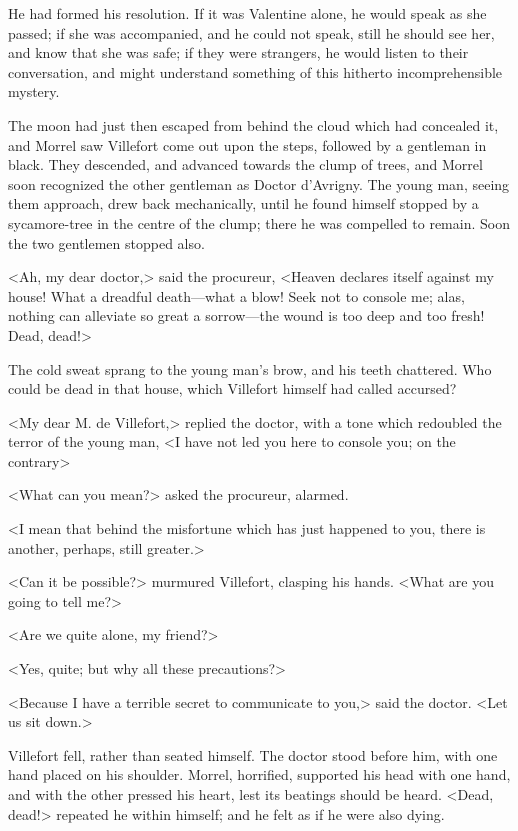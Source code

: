  He had formed his resolution. If it was Valentine alone, he would speak as she passed; if she was accompanied, and he could not speak, still he should see her, and know that she was safe; if they were strangers, he would listen to their conversation, and might understand something of this hitherto incomprehensible mystery. 

 The moon had just then escaped from behind the cloud which had concealed it, and Morrel saw Villefort come out upon the steps, followed by a gentleman in black. They descended, and advanced towards the clump of trees, and Morrel soon recognized the other gentleman as Doctor d'Avrigny.  The young man, seeing them approach, drew back mechanically, until he found himself stopped by a sycamore-tree in the centre of the clump; there he was compelled to remain. Soon the two gentlemen stopped also. 

 <Ah, my dear doctor,> said the procureur, <Heaven declares itself against my house! What a dreadful death—what a blow! Seek not to console me; alas, nothing can alleviate so great a sorrow—the wound is too deep and too fresh! Dead, dead!> 

 The cold sweat sprang to the young man's brow, and his teeth chattered. Who could be dead in that house, which Villefort himself had called accursed? 

 <My dear M. de Villefort,> replied the doctor, with a tone which redoubled the terror of the young man, <I have not led you here to console you; on the contrary\longdash> 

 <What can you mean?> asked the procureur, alarmed. 

 <I mean that behind the misfortune which has just happened to you, there is another, perhaps, still greater.> 

 <Can it be possible?> murmured Villefort, clasping his hands. <What are you going to tell me?> 

 <Are we quite alone, my friend?> 

 <Yes, quite; but why all these precautions?> 

 <Because I have a terrible secret to communicate to you,> said the doctor. <Let us sit down.> 

 Villefort fell, rather than seated himself. The doctor stood before him, with one hand placed on his shoulder. Morrel, horrified, supported his head with one hand, and with the other pressed his heart, lest its beatings should be heard. <Dead, dead!> repeated he within himself; and he felt as if he were also dying. 

